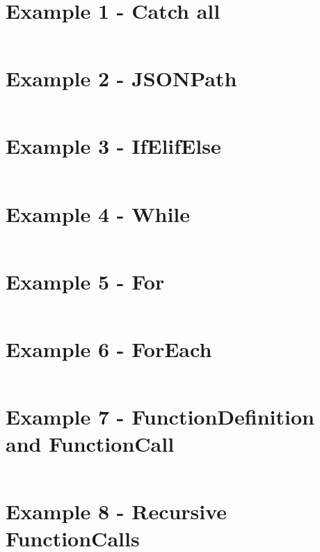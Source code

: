 \documentclass[]{full}
\theoremstyle{definition}
\begin{document}
\section{Example 1 - Catch all}
\label{appendix:sttp-examples-1}
\inputminted[autogobble, breaklines, tabsize=4]{text}{../../src/_examples/example_01/example_01.sttp}

\section{Example 2 - JSONPath}
\label{appendix:sttp-examples-2}
\inputminted[autogobble, breaklines, tabsize=4]{text}{../../src/_examples/example_02/example_02.sttp}

\section{Example 3 - IfElifElse}
\label{appendix:sttp-examples-3}
\inputminted[autogobble, breaklines, tabsize=4]{text}{../../src/_examples/example_03/example_03.sttp}

\section{Example 4 - While}
\label{appendix:sttp-examples-4}
\inputminted[autogobble, breaklines, tabsize=4]{text}{../../src/_examples/example_04/example_04.sttp}

\section{Example 5 - For}
\label{appendix:sttp-examples-5}
\inputminted[autogobble, breaklines, tabsize=4]{text}{../../src/_examples/example_05/example_05.sttp}

\section{Example 6 - ForEach}
\label{appendix:sttp-examples-6}
\inputminted[autogobble, breaklines, tabsize=4]{text}{../../src/_examples/example_06/example_06.sttp}

\section{Example 7 - FunctionDefinition and FunctionCall}
\label{appendix:sttp-examples-7}
\inputminted[autogobble, breaklines, tabsize=4]{text}{../../src/_examples/example_07/example_07.sttp}

\section{Example 8 - Recursive FunctionCalls}
\label{appendix:sttp-examples-8}
\inputminted[autogobble, breaklines, tabsize=4]{text}{../../src/_examples/example_08/example_08.sttp}
\end{document}
